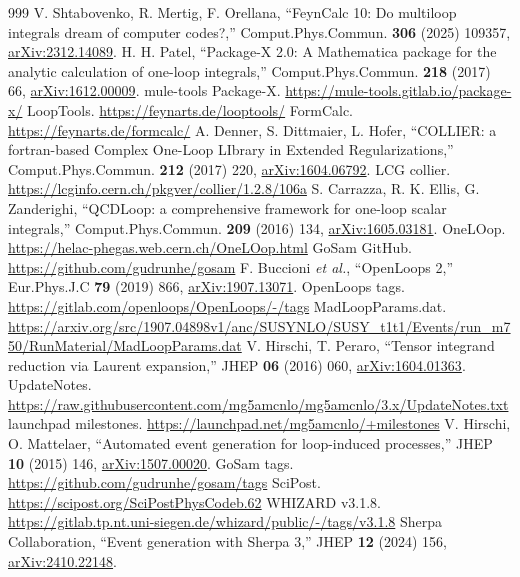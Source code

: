 \documentclass[a4paper,10pt]{ltjsarticle}
\begin{document}
\begin{thebibliography}{999}
 V. Shtabovenko, R. Mertig, F. Orellana, ``FeynCalc 10: Do multiloop integrals dream of computer codes?,'' Comput.Phys.Commun. \textbf{306} (2025) 109357, \href{https://arxiv.org/abs/2312.14089}{arXiv:2312.14089}.
 H. H. Patel, ``Package-X 2.0: A Mathematica package for the analytic calculation of one-loop integrals,'' Comput.Phys.Commun. \textbf{218} (2017) 66, \href{https://arxiv.org/abs/1612.00009}{arXiv:1612.00009}.
 mule-tools Package-X. \url{https://mule-tools.gitlab.io/package-x/}
 LoopTools. \url{https://feynarts.de/looptools/}
 FormCalc. \url{https://feynarts.de/formcalc/}
 A. Denner, S. Dittmaier, L. Hofer, ``COLLIER: a fortran-based Complex One-Loop LIbrary in Extended Regularizations,'' Comput.Phys.Commun. \textbf{212} (2017) 220, \href{https://arxiv.org/abs/1604.06792}{arXiv:1604.06792}.
 LCG collier. \url{https://lcginfo.cern.ch/pkgver/collier/1.2.8/106a}
 S. Carrazza, R. K. Ellis, G. Zanderighi, ``QCDLoop: a comprehensive framework for one-loop scalar integrals,'' Comput.Phys.Commun. \textbf{209} (2016) 134, \href{https://arxiv.org/abs/1605.03181}{arXiv:1605.03181}.
 OneLOop. \url{https://helac-phegas.web.cern.ch/OneLOop.html}
 GoSam GitHub. \url{https://github.com/gudrunhe/gosam}
 F. Buccioni \textit{et al.}, ``OpenLoops 2,'' Eur.Phys.J.C \textbf{79} (2019) 866, \href{https://arxiv.org/abs/1907.13071}{arXiv:1907.13071}.
 OpenLoops tags. \url{https://gitlab.com/openloops/OpenLoops/-/tags}
 MadLoopParams.dat. \url{https://arxiv.org/src/1907.04898v1/anc/SUSYNLO/SUSY_t1t1/Events/run_m750/RunMaterial/MadLoopParams.dat}
 V. Hirschi, T. Peraro, ``Tensor integrand reduction via Laurent expansion,'' JHEP \textbf{06} (2016) 060, \href{https://arxiv.org/abs/1604.01363}{arXiv:1604.01363}.
 UpdateNotes. \url{https://raw.githubusercontent.com/mg5amcnlo/mg5amcnlo/3.x/UpdateNotes.txt}
 launchpad milestones. \url{https://launchpad.net/mg5amcnlo/+milestones}
 V. Hirschi, O. Mattelaer, ``Automated event generation for loop-induced processes,'' JHEP \textbf{10} (2015) 146, \href{https://arxiv.org/abs/1507.00020}{arXiv:1507.00020}.
 GoSam tags. \url{https://github.com/gudrunhe/gosam/tags}
 SciPost. \url{https://scipost.org/SciPostPhysCodeb.62}
 WHIZARD v3.1.8. \url{https://gitlab.tp.nt.uni-siegen.de/whizard/public/-/tags/v3.1.8}
 Sherpa Collaboration, ``Event generation with Sherpa 3,'' JHEP \textbf{12} (2024) 156, \href{https://arxiv.org/abs/2410.22148}{arXiv:2410.22148}.

\end{thebibliography}
\end{document}
